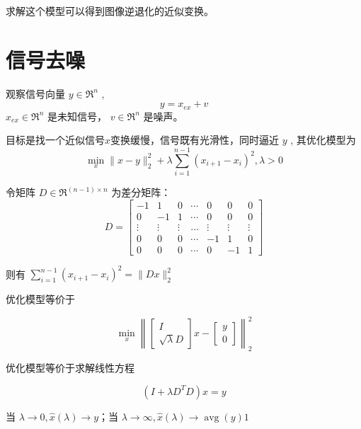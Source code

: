 求解这个模型可以得到图像逆退化的近似变换。





\section{信号去噪}

\begin{problem}[信号去噪问题]
    观察信号向量 $ y \in \mathfrak{R}^{n} $ ,
\begin{equation}
y=x_{e x}+v
\end{equation}
$ x_{e x} \in \mathfrak{R}^{n} $ 是未知信号， $ v \in \mathfrak{R}^{n} $ 是噪声。






    目标是找一个近似信号$x$变换缓慢，信号既有光滑性，同时逼近 $ y $ , 其优化模型为
\begin{equation}
\min _{x}\|x-y\|_{2}^{2}+\lambda \sum_{i=1}^{n-1}\left(x_{i+1}-x_{i}\right)^{2}, \lambda>0
\end{equation}
\end{problem}


\begin{definition}[差分矩阵]
    令矩阵 $ D \in \mathfrak{R}^{(n-1) \times n} $ 为差分矩阵：
\begin{equation} D=\left[\begin{array}{ccccccc}-1 & 1 & 0 & \cdots & 0 & 0 & 0 \\ 0 & -1 & 1 & \cdots & 0 & 0 & 0 \\ \vdots & \vdots & \vdots & \ldots & \vdots & \vdots & \vdots \\ 0 & 0 & 0 & \cdots & -1 & 1 & 0 \\ 0 & 0 & 0 & \cdots & 0 & -1 & 1\end{array}\right] \end{equation}

\end{definition}


则有 $ \sum_{i=1}^{n-1}\left(x_{i+1}-x_{i}\right)^{2}=\|D x\|_{2}^{2} $

优化模型等价于

\begin{equation} \min _{x}\left\|\left[\begin{array}{c}I \\ \sqrt{\lambda} D\end{array}\right] x-\left[\begin{array}{l}y \\ 0\end{array}\right]\right\|_{2}^{2} \end{equation}

优化模型等价于求解线性方程

\begin{equation}
\left(I+\lambda D^{T} D\right) x=y
\end{equation}

当 $ \lambda \rightarrow 0, \hat{x}(\lambda) \rightarrow y $；当 $ \lambda \rightarrow \infty, \hat{x}(\lambda) \rightarrow \operatorname{avg}(y) 1 $
